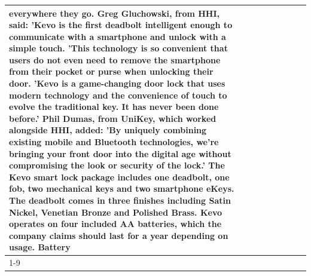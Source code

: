 \begin{table}[H]
\begin{tabular}{lllrlllll}
everywhere they go. Greg Gluchowski, from HHI, said: 'Kevo is the first deadbolt intelligent enough to communicate with a smartphone and unlock with a simple touch. 'This technology is so convenient that users do not even need to remove the smartphone from their pocket or purse when unlocking their door. 'Kevo is a game-changing door lock that uses modern technology and the convenience of touch to evolve the traditional key. It has never been done before.' Phil Dumas, from UniKey, which worked alongside HHI, added: 'By uniquely combining existing mobile and Bluetooth technologies, we’re bringing your front door into the digital age without compromising the look or security of the lock.' The Kevo smart lock package includes one deadbolt, one fob, two mechanical keys and two smartphone eKeys. The deadbolt comes in three finishes including Satin Nickel, Venetian Bronze and Polished Brass. Kevo operates on four included AA batteries, which the company claims should last for a year depending on usage. Battery \\
\cline{1-9}

\end{tabular}
\end{table}
